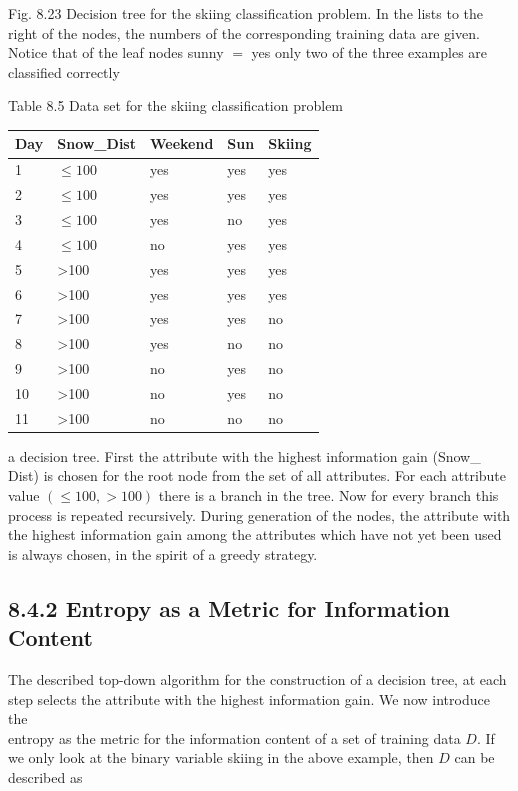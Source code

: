 \documentclass[10pt]{article}
\begin{document}
Fig. 8.23 Decision tree for the skiing classification problem. In the lists to the right of the nodes, the numbers of the corresponding training data are given. Notice that of the leaf nodes sunny $=$ yes only two of the three examples are classified correctly

Table 8.5 Data set for the skiing classification problem

\begin{center}
\begin{tabular}{|l|l|l|l|l|}
\hline
Day & Snow\_Dist & Weekend & Sun & Skiing \\
\hline
1 & $\leq 100$ & yes & yes & yes \\
\hline
2 & $\leq 100$ & yes & yes & yes \\
\hline
3 & $\leq 100$ & yes & no & yes \\
\hline
4 & $\leq 100$ & no & yes & yes \\
\hline
5 & >100 & yes & yes & yes \\
\hline
6 & >100 & yes & yes & yes \\
\hline
7 & >100 & yes & yes & no \\
\hline
8 & >100 & yes & no & no \\
\hline
9 & >100 & no & yes & no \\
\hline
10 & >100 & no & yes & no \\
\hline
11 & >100 & no & no & no \\
\hline
\end{tabular}
\end{center}

a decision tree. First the attribute with the highest information gain (Snow\_ Dist) is chosen for the root node from the set of all attributes. For each attribute value $(\leq 100,>100)$ there is a branch in the tree. Now for every branch this process is repeated recursively. During generation of the nodes, the attribute with the highest information gain among the attributes which have not yet been used is always chosen, in the spirit of a greedy strategy.


\subsection*{8.4.2 Entropy as a Metric for Information Content}
The described top-down algorithm for the construction of a decision tree, at each step selects the attribute with the highest information gain. We now introduce the\\
entropy as the metric for the information content of a set of training data $D$. If we only look at the binary variable skiing in the above example, then $D$ can be described as
\end{document}
